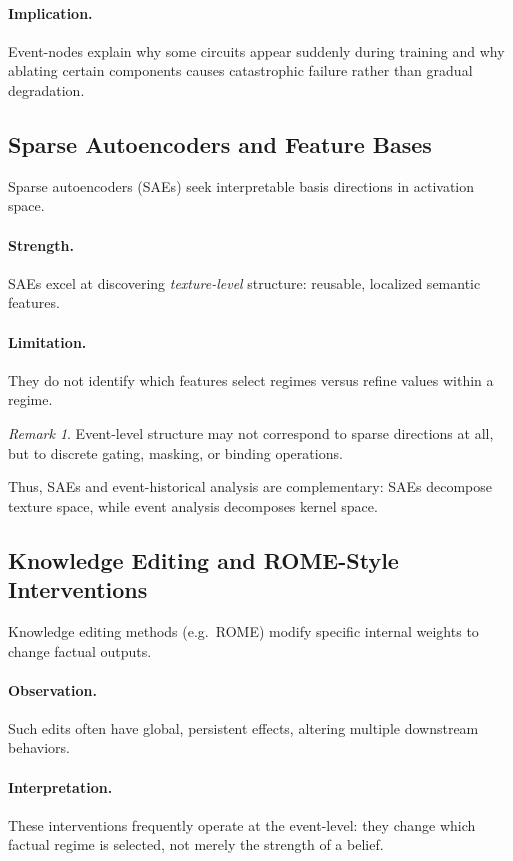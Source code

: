 \documentclass[11pt]{article}
\theoremstyle{remark}
\newtheorem{remark}{Remark}
\begin{document}
\paragraph{Implication.}
Event-nodes explain why some circuits appear suddenly during training
and why ablating certain components causes catastrophic failure rather
than gradual degradation.

\subsection{Sparse Autoencoders and Feature Bases}

Sparse autoencoders (SAEs) seek interpretable basis directions in
activation space.

\paragraph{Strength.}
SAEs excel at discovering \emph{texture-level} structure: reusable,
localized semantic features.

\paragraph{Limitation.}
They do not identify which features select regimes versus refine values
within a regime.

\begin{remark}
Event-level structure may not correspond to sparse directions at all,
but to discrete gating, masking, or binding operations.
\end{remark}

Thus, SAEs and event-historical analysis are complementary: SAEs
decompose texture space, while event analysis decomposes kernel space.

\subsection{Knowledge Editing and ROME-Style Interventions}

Knowledge editing methods (e.g.\ ROME) modify specific internal weights
to change factual outputs.

\paragraph{Observation.}
Such edits often have global, persistent effects, altering multiple
downstream behaviors.

\paragraph{Interpretation.}
These interventions frequently operate at the event-level: they change
which factual regime is selected, not merely the strength of a belief.
\end{document}
